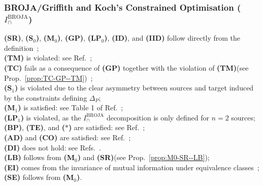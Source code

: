 \documentclass{article}
\newcommand{\ts}[1]{\ensuremath{_{\text{#1}}}}
\newcommand{\SR}{\textbf{(SR)}\xspace} %
\newcommand{\Sz}{\textbf{(S\ts{0})}\xspace} %
\newcommand{\Mz}{\textbf{(M\ts{0})}\xspace} %
\newcommand{\GP}{\textbf{(GP)}\xspace} %
\newcommand{\LPz}{\textbf{(LP\ts{0})}\xspace} %
\newcommand{\ID}{\textbf{(ID)}\xspace} %
\newcommand{\IID}{\textbf{(IID)}\xspace} %
\newcommand{\TM}{\textbf{(TM)}\xspace} %
\newcommand{\TC}{\textbf{(TC)}\xspace} %
\newcommand{\So}{\textbf{(S\ts{1})}\xspace} %
\newcommand{\Mo}{\textbf{(M\ts{1})}\xspace} %
\newcommand{\LPo}{\textbf{(LP\ts{1})}\xspace} %
\newcommand{\BP}{\textbf{(BP)}\xspace} %
\newcommand{\TE}{\textbf{(TE)}\xspace} %
\newcommand{\AST}{\textbf{($\boldsymbol{\ast}$)}\xspace} %
\newcommand{\AD}{\textbf{(AD)}\xspace} %
\newcommand{\CO}{\textbf{(CO)}\xspace} %
\newcommand{\LB}{\textbf{(LB)}\xspace} %
\newcommand{\EI}{\textbf{(EI)}\xspace} %
\newcommand{\SE}{\textbf{(SE)}\xspace} %
\newcommand{\DI}{\textbf{(DI)}\xspace}
\newcommand{\IBROJA}{\ensuremath{I_\cap^{\text{BROJA}}}\xspace}
\begin{document}
\subsubsection*{BROJA/Griffith and Koch's Constrained Optimisation ($\IBROJA$)}
    \SR, \Sz, \Mz, \GP, \LPz, \ID, and \IID follow directly from the definition~\cite{bertschinger2014quantifying}; \\
    \TM is violated: see Ref.~\cite{rauh2014reconsidering}; \\
    \TC fails as a consequence of \GP together with the violation of \TM (see Prop.~\ref{prop:TC-GP--TM})~\cite{griffith2015quantifying, banerjee2015synergy}; \\
    \So is violated due to the clear asymmetry between sources and target induced by the constraints defining $\Delta_P$; \\  
    \Mo is satisfied: see Table 1 of Ref.~\cite{banerjee2015synergy}; \\
    \LPo is violated, as the $\IBROJA$ decomposition is only defined for $n=2$ sources; \\
    \BP, \TE, and \AST are satisfied: see Ref.~\cite{kolchinsky2022novel}; \\
    \AD and \CO are satisfied: see Ref.~\cite{rauh2023continuity}; \\
    \DI does not hold: see Refs.~\cite{rauh2021properties, rauh2023continuity}. \\
    \LB follows from \Mz and \SR (see Prop.~\ref{prop:M0-SR--LB}); \\
    \EI comes from the invariance of mutual information under equivalence classes~\cite{li2011connection}; \\
    \SE follows from \Mz.
    
\end{document}

